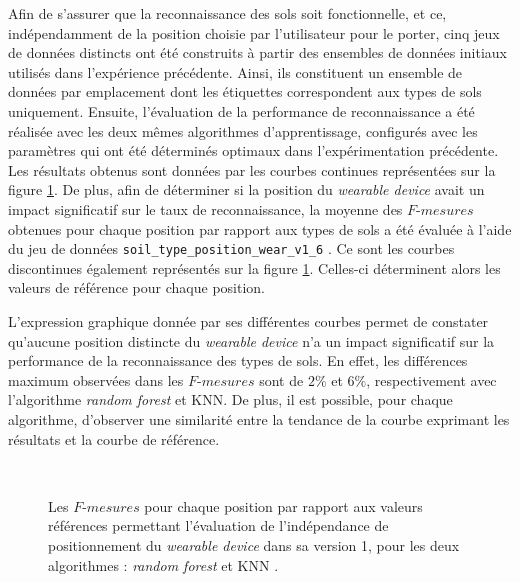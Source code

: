 Afin de s'assurer que la reconnaissance des sols soit fonctionnelle, et ce, indépendamment de la position choisie par l'utilisateur pour le porter, cinq jeux de données distincts ont été construits à partir des ensembles de données initiaux utilisés dans l'expérience précédente. Ainsi, ils constituent un ensemble de données par emplacement dont les étiquettes correspondent aux types de sols uniquement. Ensuite, l'évaluation de la performance de reconnaissance a été réalisée avec les deux mêmes algorithmes d'apprentissage, configurés avec les paramètres qui ont été déterminés optimaux dans l'expérimentation précédente. Les résultats obtenus sont données par les courbes continues représentées sur la figure \ref{fig:pos_ind_wear_v1}. De plus, afin de déterminer si la position du \textit{wearable device} avait un impact significatif sur le taux de reconnaissance, la moyenne des $F\mbox{-}mesures$ obtenues pour chaque position par rapport aux types de sols a été évaluée à l'aide du jeu de données \og \texttt{soil\_type\_position\_wear\_v1\_6} \fg. Ce sont les courbes discontinues également représentés sur la figure \ref{fig:pos_ind_wear_v1}. Celles-ci déterminent alors les valeurs de référence pour chaque position.

L'expression graphique donnée par ses différentes courbes permet de constater qu'aucune position distincte du \textit{wearable device} n'a un impact significatif sur la performance de la reconnaissance des types de sols. En effet, les différences maximum observées dans les $F\mbox{-}mesures$ sont de $2\%$ et $6\%$, respectivement avec l'algorithme \textit{random forest} et \acs{KNN}. De plus, il est possible, pour chaque algorithme, d'observer une similarité entre la tendance de la courbe exprimant les résultats et la courbe de référence.

\begin{figure}[H]
  \centering
{}
  \\[20pt]
  \caption[Les $F\mbox{-} mesures$ pour chaque position par rapport aux valeurs références permettant l'évaluation de l'indépendance de positionnement du \textit{wearable device} dans sa version 1, pour les deux algorithmes : \textit{random forest} et \acs{KNN}.]{Les $F\mbox{-} mesures$ pour chaque position par rapport aux valeurs références permettant l'évaluation de l'indépendance de positionnement du \textit{wearable device} dans sa version 1, pour les deux algorithmes : \textit{random forest} et \acs{KNN} \citep{Thullier2017}.}
  \label{fig:pos_ind_wear_v1}
\end{figure}


